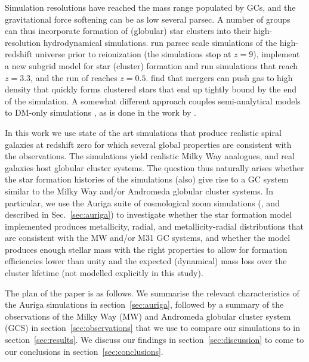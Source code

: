 \documentclass[a4paper,fleqn,usenatbib]{mnras}
\begin{document}
Simulation resolutions have reached the mass range populated by GCs, and the
gravitational force softening can be as low several parsec. A number of groups 
can thus incorporate formation of (globular) star clusters into their 
high-resolution hydrodynamical simulations. \citet{2016ApJ...831..204R} 
run parsec scale simulations of the high-redshift universe 
prior to reionization (the simulations stop at $z=9$), \citet{2017ApJ...834...69L} 
implement a new subgrid model for star (cluster) formation and run simulations 
that reach $z=3.3$, and the run of \citet{2017MNRAS.465.3622R} reaches $z=0.5$. 
\citet{2018MNRAS.474.4232K} find that mergers can push gas to high density that
quickly forms clustered stars that end up tightly bound by the end of the 
simulation. A somewhat different approach couples semi-analytical models to DM-only
simulations \citep{2010ApJ...718.1266M,2014ApJ...796...10L,2018MNRAS.480.2343C,
2019MNRAS.486..331C,2019arXiv190505199C}, as is done in the work by 
\citet{2019MNRAS.482.4528E}.

In this work we use state of the art simulations that produce realistic spiral 
galaxies at redshift zero for which several global properties are consistent with 
the observations. The simulations yield realistic Milky Way analogues, and real
galaxies host globular cluster systems. The question thus naturally arises whether 
the star formation histories of the simulations (also) give rise to a GC system 
similar to the Milky Way and/or Andromeda globular cluster systems. In particular, 
we use the Auriga suite of cosmological zoom simulations 
(\citealt{2017MNRAS.467..179G}, and described in Sec.~\ref{sec:auriga}) to
investigate whether the star formation model implemented produces metallicity, 
radial, and metallicity-radial distributions that are consistent with the MW 
and/or M31 GC systems, and whether the model produces enough stellar mass with
the right properties to allow for formation efficiencies lower than unity and
the expected (dynamical) mass loss over the cluster lifetime (not modelled 
explicitly in this study). 

The plan of the paper is as follows. We summarise the relevant characteristics 
of the Auriga simulations in section~\ref{sec:auriga}, followed by a summary of 
the observations of the Milky Way (MW) and Andromeda globular cluster system (GCS)
in section~\ref{sec:observations} that we use to compare our simulations to in
section~\ref{sec:results}. We discuss our findings in section~\ref{sec:discussion}
to come to our conclusions in section~\ref{sec:conclusions}.
\end{document}
